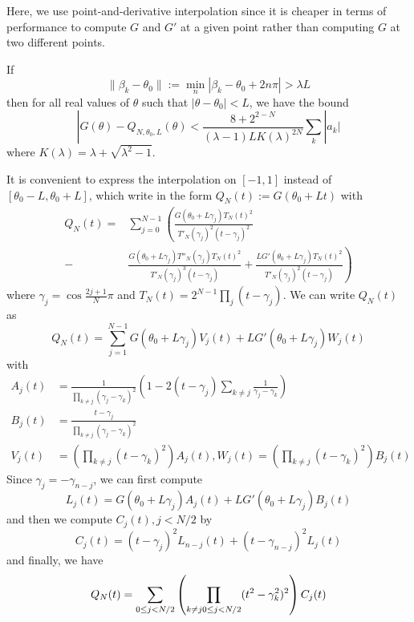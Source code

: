\documentclass[conference,9pt]{IEEEtran}
\theoremstyle{definition}
\begin{document}
Here, we use point-and-derivative interpolation since it is cheaper in terms of performance to compute $G$ and $G'$ at a given point rather
than computing $G$ at two different points.

If 
\begin{equation*}
    \|\beta_k-\theta_0\|:=\min_n |\beta_k-\theta_0+2n\pi|>\lambda L    
\end{equation*}
then for all real values of $\theta$ such that $|\theta-\theta_0|<L$, we have the bound
\begin{equation}
    \label{bound}
    |G(\theta)-Q_{N,\theta_0,L}(\theta)<\frac{8+2^{2-N}}{(\lambda-1)LK(\lambda)^{2N}}\sum_k|a_k|
\end{equation}
where $K(\lambda)=\lambda+\sqrt{\lambda^2-1}$.

It is convenient to express the interpolation on $[-1,1]$ instead of $[\theta_0-L,\theta_0+L]$, which write in the form $Q_N(t):=G(\theta_0+Lt)$ with
\begin{equation*}
    \begin{split}
        Q_N(t)=&\sum\limits_{j=0}^{N-1}
        \left(
        \frac{G(\theta_0+L\gamma_j)T_N(t)^2}{T'_N(\gamma_j)^2(t-\gamma_j)^2}\right.\\
        -&\left.\frac{G(\theta_0+L\gamma_j)T''_N(\gamma_j)T_N(t)^2}{T'_N(\gamma_j)^3(t-\gamma_j)}+
            \frac{LG'(\theta_0+L\gamma_j)T_N(t)^2}{T'_N(\gamma_j)^2(t-\gamma_j)}
        \right)
    \end{split}
\end{equation*}
where $\gamma_j=\cos\frac{2j+1}{N}\pi$ and $T_N(t)=2^{N-1}\prod_j(t-\gamma_j)$. We can write $Q_N(t)$ as
\begin{equation*}
    Q_N(t)=\sum_{j=1}^{N-1} G(\theta_0+L\gamma_j)V_j(t)+LG'(\theta_0+L\gamma_j)W_j(t)
\end{equation*}
with
\begin{subequations}
\begin{align*}
    A_j(t)&=\frac{1}{\prod_{k\neq j}(\gamma_j-\gamma_k)^2}\left(
        1-2(t-\gamma_j)\sum_{k\neq j}\frac{1}{\gamma_j-\gamma_k}
    \right)\\
    B_j(t)&=\frac{t-\gamma_j}{\prod_{k\neq j}(\gamma_j-\gamma_k)^2}\\
    V_j(t)&=\left(\prod_{k\neq j}(t-\gamma_k)^2\right)A_j(t),W_j(t)=\left(\prod_{k\neq j}(t-\gamma_k)^2\right)B_j(t)
\end{align*}  
\end{subequations}
Since $\gamma_j=-\gamma_{n-j}$, we can first compute
\begin{equation*}
    L_j(t)=G(\theta_0+L\gamma_j)A_j(t)+LG'(\theta_0+L\gamma_j)B_j(t)
\end{equation*}
and then we compute $C_j(t),j<N/2$ by
\begin{equation*}
    C_j(t)=(t-\gamma_j)^2L_{n-j}(t)+(t-\gamma_{n-j})^2L_j(t)
\end{equation*}
and finally, we have
\begin{equation*}
    Q_N(t)=\sum_{0\leq j<N/2}\left(
        \prod_{k\neq j\\0\leq j<N/2}(t^2-\gamma_k^2)^2
    \right)C_j(t)
\end{equation*}
\end{document}
